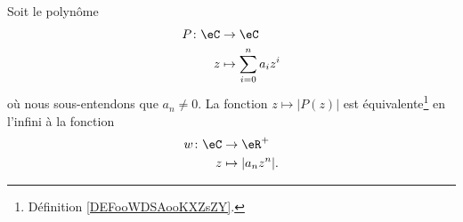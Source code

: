\begin{proposition}     \label{PROPooPWVWooGuftxZ}
    Soit le polynôme
    \begin{equation}
        \begin{aligned}
            P\colon \eC&\to \eC \\
            z&\mapsto \sum_{i=0}^na_iz^i 
        \end{aligned}
    \end{equation}
    où nous sous-entendons que \( a_n\neq 0\). La fonction \( z\mapsto | P(z) |\) est équivalente\footnote{Définition \ref{DEFooWDSAooKXZsZY}.} en l'infini à la fonction
    \begin{equation}
        \begin{aligned}
            w\colon \eC&\to \eR^+ \\
            z&\mapsto | a_nz^n |. 
        \end{aligned}
    \end{equation}
\end{proposition}

